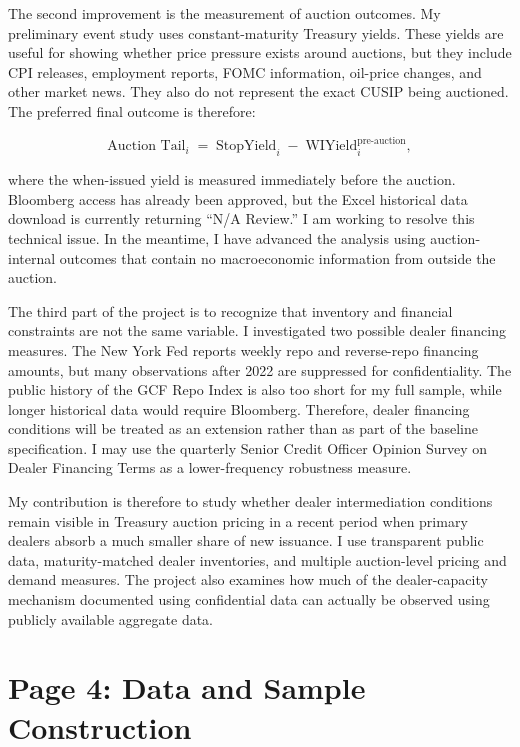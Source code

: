 \documentclass[12pt]{article}
\begin{document}
The second improvement is the measurement of auction outcomes. My preliminary event study uses constant-maturity Treasury yields. These yields are useful for showing whether price pressure exists around auctions, but they include CPI releases, employment reports, FOMC information, oil-price changes, and other market news. They also do not represent the exact CUSIP being auctioned. The preferred final outcome is therefore:

\begin{equation*}
\text{Auction Tail}_i \;=\; \text{StopYield}_i \;-\; \text{WIYield}_i^{\text{pre-auction}},
\end{equation*}

where the when-issued yield is measured immediately before the auction. Bloomberg access has already been approved, but the Excel historical data download is currently returning ``N/A Review.'' I am working to resolve this technical issue. In the meantime, I have advanced the analysis using auction-internal outcomes that contain no macroeconomic information from outside the auction.

The third part of the project is to recognize that inventory and financial constraints are not the same variable. I investigated two possible dealer financing measures. The New York Fed reports weekly repo and reverse-repo financing amounts, but many observations after 2022 are suppressed for confidentiality. The public history of the GCF Repo Index is also too short for my full sample, while longer historical data would require Bloomberg. Therefore, dealer financing conditions will be treated as an extension rather than as part of the baseline specification. I may use the quarterly Senior Credit Officer Opinion Survey on Dealer Financing Terms as a lower-frequency robustness measure.

My contribution is therefore to study whether dealer intermediation conditions remain visible in Treasury auction pricing in a recent period when primary dealers absorb a much smaller share of new issuance. I use transparent public data, maturity-matched dealer inventories, and multiple auction-level pricing and demand measures. The project also examines how much of the dealer-capacity mechanism documented using confidential data can actually be observed using publicly available aggregate data.

\newpage
\section{Page 4: Data and Sample Construction}
\end{document}
